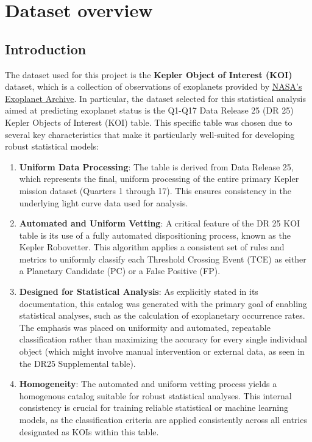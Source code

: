 \chapter{Dataset overview}
\section{Introduction}
The dataset used for this project is the \textbf{Kepler Object of Interest (KOI)} dataset, which is a collection of observations of exoplanets provided by \href{https://exoplanetarchive.ipac.caltech.edu/index.html}{NASA's Exoplanet Archive}. In particular, the dataset selected for this statistical analysis aimed at predicting exoplanet status is the Q1-Q17 Data Release 25 (DR 25) Kepler Objects of Interest (KOI) table. This specific table was chosen due to several key characteristics that make it particularly well-suited for developing robust statistical models:

\begin{enumerate}
    \item \textbf{Uniform Data Processing}: The table is derived from Data Release 25, which represents the final, uniform processing of the entire primary Kepler mission dataset (Quarters 1 through 17). This ensures consistency in the underlying light curve data used for analysis.
    \item \textbf{Automated and Uniform Vetting}: A critical feature of the DR 25 KOI table is its use of a fully automated dispositioning process, known as the Kepler Robovetter. This algorithm applies a consistent set of rules and metrics to uniformly classify each Threshold Crossing Event (TCE) as either a Planetary Candidate (PC) or a False Positive (FP).
    \item \textbf{Designed for Statistical Analysis}: As explicitly stated in its documentation, this catalog was generated with the primary goal of enabling statistical analyses, such as the calculation of exoplanetary occurrence rates. The emphasis was placed on uniformity and automated, repeatable classification rather than maximizing the accuracy for every single individual object (which might involve manual intervention or external data, as seen in the DR25 Supplemental table).
    \item \textbf{Homogeneity}: The automated and uniform vetting process yields a homogenous catalog suitable for robust statistical analyses. This internal consistency is crucial for training reliable statistical or machine learning models, as the classification criteria are applied consistently across all entries designated as KOIs within this table.
\end{enumerate}

